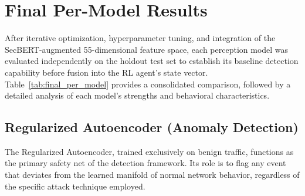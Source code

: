 \section{Final Per-Model Results}
\label{sec:final_per_model}

After iterative optimization, hyperparameter tuning, and integration of the SecBERT-augmented 55-dimensional feature space, each perception model was evaluated independently on the holdout test set to establish its baseline detection capability before fusion into the RL agent's state vector. Table~\ref{tab:final_per_model} provides a consolidated comparison, followed by a detailed analysis of each model's strengths and behavioral characteristics.

\begin{table}[H]
    \centering
    \caption{Final Per-Model Detection Performance on the Holdout Test Set}
    \label{tab:final_per_model}
\end{table}

\subsection{Regularized Autoencoder (Anomaly Detection)}

The Regularized Autoencoder, trained exclusively on benign traffic, functions as the primary safety net of the detection framework. Its role is to flag any event that deviates from the learned manifold of normal network behavior, regardless of the specific attack technique employed.

